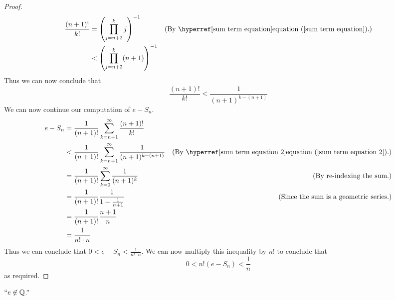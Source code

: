 \begin{proof}
\begin{align*}
                \frac{(n + 1)!}{k!} &= \left(\prod_{j = n + 2}^{k} j \right)^{-1}
                                    & \just{By \equationRef{sum term equation}.}
                                    &< \left(\prod_{j = n + 2}^{k} (n + 1) \right)^{-1}\\
            \end{align*}
            Thus we can now conclude that
            \begin{equation}
                \label{sum term equation 2}
                \frac{(n + 1)!}{k!} < \frac{1}{(n + 1)^{k - (n + 1)}}
            \end{equation}
            We can now continue our computation of $e - S_n$.
            \begin{align*}
                e - S_n &= \frac{1}{(n + 1)!} \sum_{k = n + 1}^{\infty} \frac{(n + 1)!}{k!} \\
                        &< \frac{1}{(n + 1)!} \sum_{k = n + 1}^{\infty} \frac{1}{(n + 1)^{k - (n + 1)}}
                        & \just{By \equationRef{sum term equation 2}.}
                        &= \frac{1}{(n + 1)!} \sum_{k = 0}^{\infty} \frac{1}{(n + 1)^{k}}
                        & \just{By re-indexing the sum.}
                        &= \frac{1}{(n + 1)!} \frac{1}{1 - \frac{1}{n + 1}}
                        & \just{Since the sum is a geometric series.}
                        &= \frac{1}{(n + 1)!} \frac{n + 1}{n} \\
                        &= \frac{1}{n! \cdot n}
            \end{align*}
            Thus we can conclude that $0 < e - S_n < \frac{1}{n! \cdot n}$. We can now multiply
            this inequality by $n!$ to conclude that
            \begin{equation}
                0 < n! (e - S_n) < \frac{1}{n}
            \end{equation}
            as required. \QED
        \end{proof}
        \begin{theorem}
            $``e \not\in \mathbb{Q}$.''
        \end{theorem}
